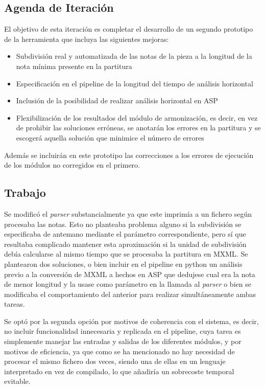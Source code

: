 \subsection{Agenda de Iteración}
El objetivo de esta iteración es completar el desarrollo de un segundo prototipo de la herramienta que incluya las siguientes mejoras:
\begin{itemize}
	\item Subdivisión real y automatizada de las notas de la pieza a la longitud de la nota mínima presente en la partitura
	\item Especificación en el pipeline de la longitud del tiempo de análisis horizontal
	\item Inclusión de la posibilidad de realizar análisis horizontal en ASP
	\item Flexibilización de los resultados del módulo de armonización, es decir, en vez de prohibir las soluciones erróneas, se anotarán los errores en la partitura y se escogerá aquella solución que minimice el número de errores
\end{itemize}
Además se incluirán en este prototipo las correcciones a los errores de ejecución de los módulos no corregidos en el primero.

\subsection{Trabajo}
Se modificó el \textit{parser} substancialmente ya que este imprimía a un fichero según procesaba las notas. Esto no planteaba problema alguno si la subdivisión se especificaba de antemano mediante el parámetro correspondiente, pero sí que resultaba complicado mantener esta aproximación si la unidad de subdivisión debía calcularse al mismo tiempo que se procesaba la partitura en MXML. Se plantearon dos soluciones, o bien incluir en el pipeline en python un análisis previo a la conversión de MXML a hechos en ASP que dedujese cual era la nota de menor longitud y la usase como parámetro en la llamada al \textit{parser} o bien se modificaba el comportamiento del anterior para realizar simultáneamente ambas tareas. 

Se optó por la segunda opción por motivos de coherencia con el sistema, es decir, no incluir funcionalidad innecesaria y replicada en el pipeline, cuya tarea es simplemente manejar las entradas y salidas de los diferentes módulos, y por motivos de eficiencia, ya que como se ha mencionado no hay necesidad de procesar el mismo fichero dos veces, siendo una de ellas en un lenguaje interpretado en vez de compilado, lo que añadiría un sobrecoste temporal evitable.

